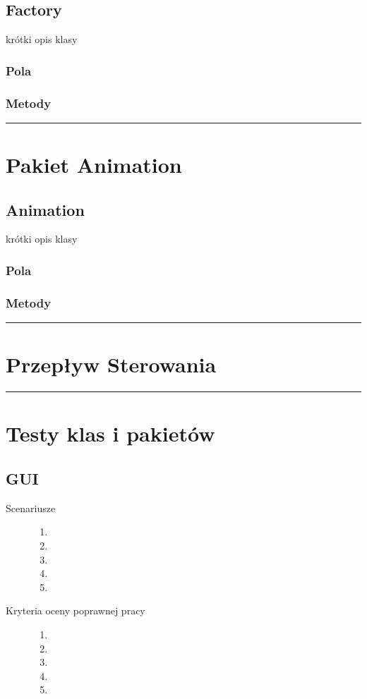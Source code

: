 \documentclass[a4paper,11pt]{article}
\newcommand{\linia}{\rule{\linewidth}{0.4mm}}
\begin{document}
\subsection{Factory}
krótki opis klasy
\subsubsection{Pola}

\subsubsection{Metody}

\noindent\linia

\section{Pakiet Animation}

\subsection{Animation}
krótki opis klasy
\subsubsection{Pola}

\subsubsection{Metody}

\noindent\linia
\section{Przepływ Sterowania}




\noindent\linia
\section{Testy klas i pakietów}


\subsection{GUI}
\begin{description}

\item[Scenariusze] \hfill
\begin{enumerate}
\item
\item 
\item
\item
\item 
\end{enumerate}

\item[Kryteria oceny poprawnej pracy] \hfill
\begin{enumerate}
\item 
\item
\item
\item 
\item 
\end{enumerate}

\end{description}
\end{document}
